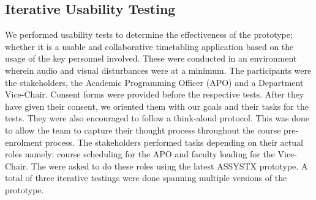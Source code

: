 \subsection{Iterative Usability Testing}
We performed usability tests to determine the effectiveness of the prototype; whether it is a usable and collaborative timetabling application based on the usage of the key personnel involved. These were conducted in an environment wherein audio and visual disturbances were at a minimum. The participants were the stakeholders, the Academic Programming Officer (APO) and a Department Vice-Chair. Consent forms were provided before the respective tests. After they have given their consent, we oriented them with our goals and their tasks for the tests. They were also encouraged to follow a think-aloud protocol. This was done to allow the team to capture their thought process throughout the course pre-enrolment process. The stakeholders performed tasks depending on their actual roles namely:  course scheduling for the APO and faculty loading for the Vice-Chair. The were asked to do these roles using the latest ASSYSTX prototype. A total of three iterative testings were done spanning multiple versions of the prototype. 

